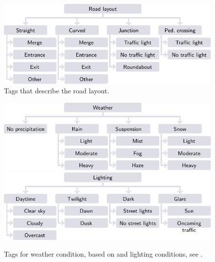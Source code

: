 \begin{figure}[t!]
	\centering
	\includegraphics{figures/road_layout}
	\caption{Tags that describe the road layout.}
	\label{fig:tree road layout}
\end{figure}

\begin{figure}[t!]
	\centering
	\includegraphics{figures/weather}\\
	\vspace{0.5em}
	\includegraphics{figures/lighting}
	\caption{Tags for weather condition, based on \cite{mahmassani2012use} and lighting conditions, see \cite{golob2003relationships}.}
	\label{fig:conditions}
\end{figure}




